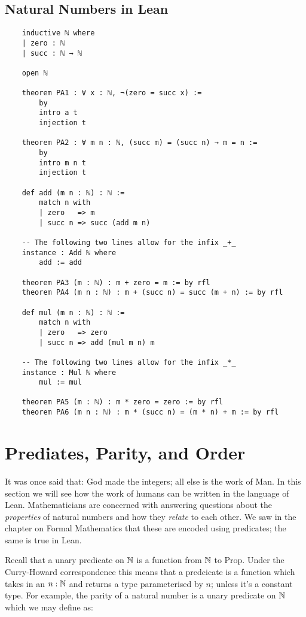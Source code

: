\documentclass{book}
\begin{document}
\newpage
\subsection*{Natural Numbers in Lean}

\begin{lstlisting}
    inductive ℕ where
    | zero : ℕ
    | succ : ℕ → ℕ
  
    open ℕ
  
    theorem PA1 : ∀ x : ℕ, ¬(zero = succ x) :=
        by
        intro a t
        injection t
    
    theorem PA2 : ∀ m n : ℕ, (succ m) = (succ n) → m = n :=
        by
        intro m n t
        injection t
    
    def add (m n : ℕ) : ℕ :=
        match n with
        | zero   => m
        | succ n => succ (add m n)
    
    -- The following two lines allow for the infix _+_
    instance : Add ℕ where
        add := add
    
    theorem PA3 (m : ℕ) : m + zero = m := by rfl
    theorem PA4 (m n : ℕ) : m + (succ n) = succ (m + n) := by rfl
    
    def mul (m n : ℕ) : ℕ :=
        match n with
        | zero   => zero
        | succ n => add (mul m n) m
        
    -- The following two lines allow for the infix _*_
    instance : Mul ℕ where
        mul := mul
    
    theorem PA5 (m : ℕ) : m * zero = zero := by rfl
    theorem PA6 (m n : ℕ) : m * (succ n) = (m * n) + m := by rfl
\end{lstlisting}

\newpage
\section{Prediates, Parity, and Order}

It was once said that: God made the integers; all else is the work of Man. In this section we will see how the work of humans can be written in the language of Lean. Mathematicians are concerned with answering questions about the \emph{properties} of natural numbers and how they \emph{relate} to each other. We saw in the chapter on Formal Mathematics that these are encoded using predicates; the same is true in Lean. 

Recall that a unary predicate on $\mathbb{N}$ is a function from $\mathbb{N}$ to Prop. Under the Curry-Howard correspondence this means that a predcicate is a function which takes in an $n : \mathbb{N}$ and returns a type parameterised by $n$; unless it's a constant type. For example, the parity of a natural number is a unary predicate on $\mathbb{N}$ which we may define as: 
\end{document}
